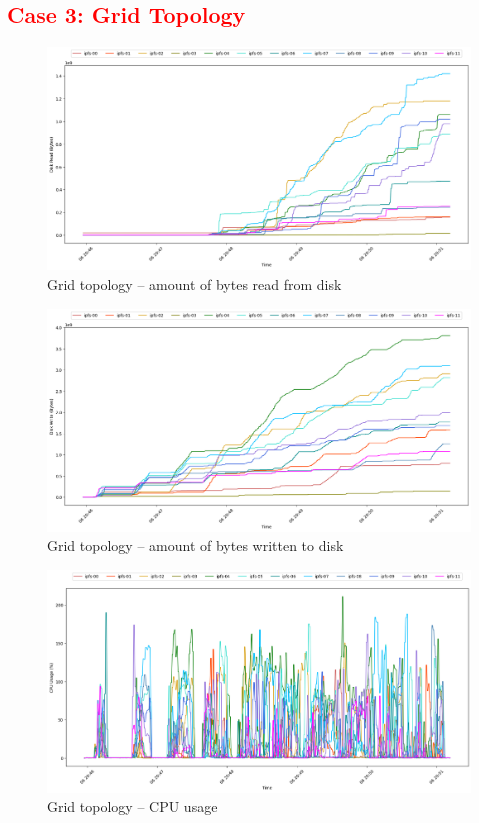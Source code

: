 \subsection{\textcolor{red}{Case 3: Grid Topology}}

\begin{figure}[H]
\includegraphics[width=\linewidth]{figures/grid/blk_read.png}
\caption{Grid topology -- amount of bytes read from disk}
\end{figure}
\begin{figure}[H]
\includegraphics[width=\linewidth]{figures/grid/blk_write.png}
\caption{Grid topology -- amount of bytes written to disk}
\end{figure}
\begin{figure}[H]
\includegraphics[width=\linewidth]{figures/grid/cpu_usage.png}
\caption{Grid topology -- CPU usage}
\end{figure}
